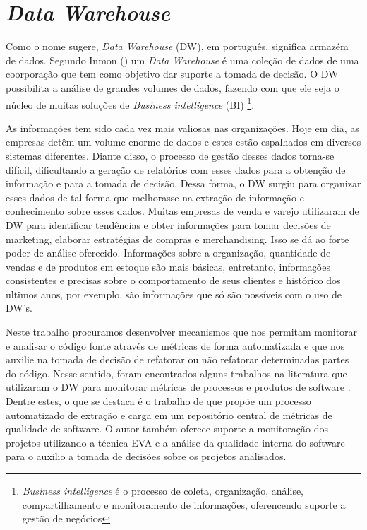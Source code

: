 \section{\emph{Data Warehouse}}
\label{cap-dw}


Como o nome sugere, \emph{Data Warehouse} (DW), em português, significa armazém de dados. Segundo Inmon (\citeyear{inmon2002}) um \emph{Data Warehouse} é uma coleção de dados de uma coorporação que tem como objetivo dar suporte a tomada de decisão. 
%
O DW possibilita a análise de grandes volumes de dados, fazendo com que ele seja o núcleo de muitas soluções de \emph{Business intelligence} (BI)
%
\footnote{\emph{Business intelligence} é o processo de coleta, organização, análise, compartilhamento e monitoramento de informações, oferencendo suporte a gestão de negócios}. 
%

As informações tem sido cada vez mais valiosas nas organizações. Hoje em dia, as empresas detêm um volume enorme de dados e estes estão espalhados em diversos sistemas diferentes. Diante disso, o processo de gestão desses dados torna-se difícil, dificultando a geração de relatórios com esses dados para a obtenção de informação e para a tomada de decisão. Dessa forma, o DW surgiu para organizar esses dados de tal forma que melhorasse na extração de informação e conhecimento sobre esses dados. Muitas empresas de venda e varejo utilizaram de DW para identificar tendências e obter informações para tomar decisões de marketing, elaborar estratégias de compras e merchandising. Isso se dá ao forte poder de análise oferecido. Informações sobre a organização, quantidade de vendas e de produtos em estoque são mais básicas, entretanto, informações consistentes e precisas sobre o comportamento de seus clientes e histórico dos ultimos anos, por exemplo, são informações que só são possíveis com o uso de DW's.

%
Neste trabalho procuramos desenvolver mecanismos que nos permitam monitorar e analisar o código fonte através de métricas de forma automatizada e que nos auxilie na tomada de decisão de refatorar ou não refatorar determinadas partes do código. 
%
Nesse sentido, foram encontrados alguns trabalhos na literatura que utilizaram o DW para monitorar métricas de processos e produtos de software \cite{Folleco2007} \cite{Silveira2010}\cite{mazuco2011}. Dentre estes, o que se destaca é o trabalho de  \cite{Silveira2010} que propõe um processo automatizado de extração e carga em um repositório central de métricas de qualidade de software. O autor também oferece suporte a monitoração dos projetos utilizando a técnica EVA e a análise da qualidade interna do software para o auxilio a tomada de decisões sobre os projetos analisados.

